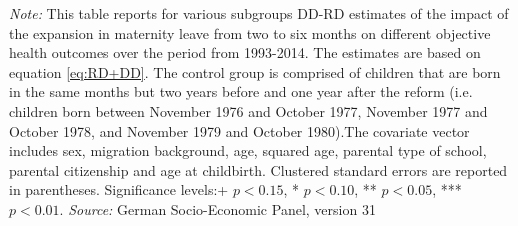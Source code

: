 \documentclass[a4paper ]{article}
\newlength\FHoffset
\begin{document}
\newpage
\begin{table}[p] \centering
\def\sym#1{\ifmmode^{#1}\else\(^{#1}\)\fi}
\caption{Heterogenity Analysis for Objective Health Outcomes, DD-RD Estimates with Covariates}\label{tab:Heterog_OHCV}
\begin{minipage}{0.98\textwidth} %
{\footnotesize \textit{Note:} This table reports for various subgroups DD-RD estimates of the impact of the expansion in maternity leave from two to six months on different objective health outcomes over the period from 1993-2014. The estimates are based on equation \ref{eq:RD+DD}. The control group is comprised of children that are born in the same months but two years before and one year after the reform (i.e. children born between November 1976 and October 1977, November 1977 and October 1978, and November 1979 and October 1980).The covariate vector includes sex, migration background, age, squared age, parental type of school, parental citizenship and age at childbirth.\newline
Clustered standard errors are reported in parentheses. Significance levels:+ \(p<0.15\), * \(p<0.10\), ** \(p<0.05\), *** \(p<0.01\). \newline \textit{Source: }German Socio-Economic Panel, version 31\par}
\end{minipage}
\end{table}
\restoregeometry

\newpage
{}	
	

	
		\setlength\FHoffset{-2.5cm} 
\fancyheadoffset{\FHoffset}	
\end{document}
